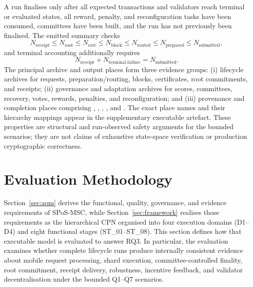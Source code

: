 \documentclass[a4paper,fleqn]{cas-sc}
\begin{document}
A run finalises only after all expected transactions and validators reach
terminal or evaluated states, all reward, penalty, and reconfiguration tasks
have been consumed, committees have been built, and the run has not previously
been finalised. The emitted summary checks
\begin{equation}
N_{\mathrm{receipt}}\leq N_{\mathrm{root}}\leq N_{\mathrm{cert}}
\leq N_{\mathrm{block}}\leq N_{\mathrm{routed}}
\leq N_{\mathrm{prepared}}\leq N_{\mathrm{submitted}},
\label{eq:lifecycle_ordering}
\end{equation}
and terminal accounting additionally requires
\begin{equation}
N_{\mathrm{receipt}}+N_{\mathrm{terminal\ failure}}
=N_{\mathrm{submitted}}.
\label{eq:terminal_accounting}
\end{equation}
The principal archive and output places form three evidence groups:
(i) lifecycle archives for requests, preparation/routing, blocks, certificates,
root commitments, and receipts; (ii) governance and adaptation archives for
scores, committees, recovery, votes, rewards, penalties, and reconfiguration;
and (iii) provenance and completion places comprising
, , ,
, and . The exact place names
and their hierarchy mappings appear in the supplementary executable artefact.
These properties are structural and run-observed safety arguments for the
bounded scenarios; they are not claims of exhaustive state-space verification
or production cryptographic correctness.

\FloatBarrier

\section{Evaluation Methodology}
\label{sec:methodology}

Section~\ref{sec:aom} derives the functional, quality, governance, and evidence
requirements of SPoS-MSC, while Section~\ref{sec:framework} realises those
requirements as the hierarchical CPN organised into four execution domains
(D1--D4) and eight functional stages (ST\_01--ST\_08). This section defines how
that executable model is evaluated to answer RQ3. In particular, the evaluation
examines whether complete lifecycle runs produce internally consistent evidence
about mobile request processing, shard execution, committee-controlled finality,
root commitment, receipt delivery, robustness, incentive feedback, and validator
decentralisation under the bounded Q1--Q7 scenarios.
\end{document}
